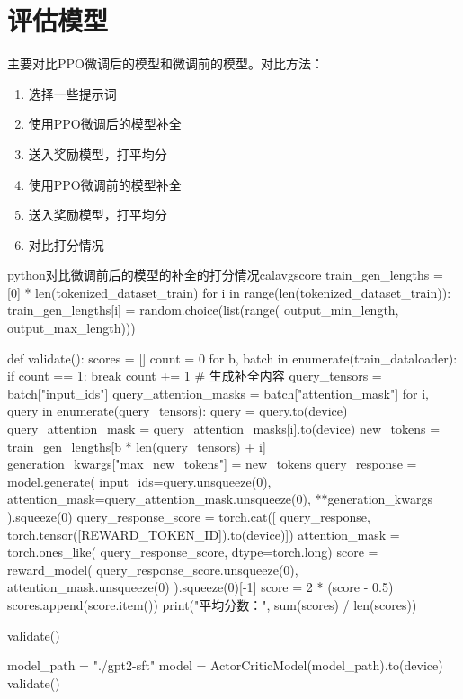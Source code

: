 \documentclass[lang=cn,newtx,10pt,scheme=chinese]{elegantbook}
\begin{document}
\section{评估模型}

\begin{marker}
主要对比PPO微调后的模型和微调前的模型。对比方法：
\begin{enumerate}
    \item 选择一些提示词
    \item 使用PPO微调后的模型补全
    \item 送入奖励模型，打平均分
    \item 使用PPO微调前的模型补全
    \item 送入奖励模型，打平均分
    \item 对比打分情况
\end{enumerate}
\end{marker}

\begin{codebox}{python}{对比微调前后的模型的补全的打分情况}{calavgscore}
train_gen_lengths = [0] * len(tokenized_dataset_train)
for i in range(len(tokenized_dataset_train)):
    train_gen_lengths[i] = random.choice(list(range(
        output_min_length,
        output_max_length)))


def validate():
    scores = []
    count = 0
    for b, batch in enumerate(train_dataloader):
        if count == 1:
            break
        count += 1
        # 生成补全内容
        query_tensors = batch["input_ids"]
        query_attention_masks = batch["attention_mask"]
        for i, query in enumerate(query_tensors):
            query = query.to(device)
            query_attention_mask = query_attention_masks[i].to(device)
            new_tokens = train_gen_lengths[b * len(query_tensors) + i]
            generation_kwargs["max_new_tokens"] = new_tokens
            query_response = model.generate(
                input_ids=query.unsqueeze(0),
                attention_mask=query_attention_mask.unsqueeze(0),
                **generation_kwargs
            ).squeeze(0)
            query_response_score = torch.cat([
                query_response,
                torch.tensor([REWARD_TOKEN_ID]).to(device)])
            attention_mask = torch.ones_like(
                query_response_score, dtype=torch.long)
            score = reward_model(
                query_response_score.unsqueeze(0),
                attention_mask.unsqueeze(0)
            ).squeeze(0)[-1]
            score = 2 * (score - 0.5)
            scores.append(score.item())
    print("平均分数：", sum(scores) / len(scores))


validate()

model_path = "./gpt2-sft"
model = ActorCriticModel(model_path).to(device)
validate()
\end{codebox}
\end{document}
